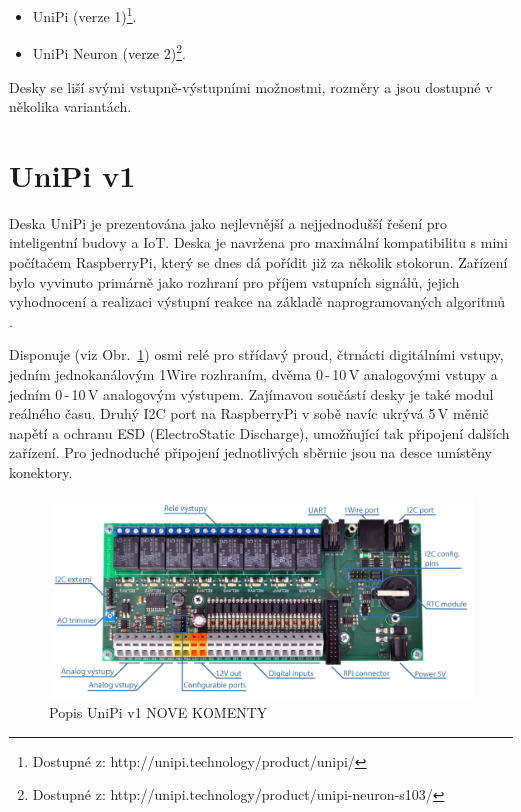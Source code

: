 \begin{itemize}
	\item UniPi (verze 1)\footnote[1]{Dostupné z: http://unipi.technology/product/unipi/}.
	\item UniPi Neuron (verze 2)\footnote[2]{Dostupné z: http://unipi.technology/product/unipi-neuron-s103/}.
\end{itemize}

\vspace{5mm}
Desky se liší svými vstupně-výstupními možnostmi, rozměry a jsou dostupné v několika variantách.




\section{UniPi v1}
\label{KapitolaUnipi1}

Deska UniPi je prezentována jako nejlevnější a nejjednodušší řešení pro inteligentní budovy a IoT. Deska je navržena pro maximální kompatibilitu s mini počítačem RaspberryPi, který se dnes dá pořídit již za několik stokorun.  Zařízení bylo vyvinuto primárně jako rozhraní pro příjem vstupních signálů, jejich vyhodnocení a realizaci výstupní reakce na základě naprogramovaných algoritmů \cite{UniPiBoard1}.

Disponuje (viz Obr.~\ref{ObrazekUnipiV1}) osmi relé pro střídavý proud, čtrnácti digitálními vstupy, jedním jednokanálovým 1Wire rozhraním, dvěma 0\,-\,10\,V analogovými vstupy a jedním 0\,-\,10\,V analogovým výstupem. Zajímavou součástí desky je také modul reálného času. Druhý I2C port na RaspberryPi v sobě navíc ukrývá 5\,V měnič napětí a ochranu ESD (ElectroStatic Discharge), umožňující tak připojení dalších zařízení. Pro jednoduché připojení jednotlivých sběrnic jsou na desce umístěny konektory.

 \begin{figure}[!h]
  \begin{center}
    \includegraphics[scale=0.35]{obrazky/unipi_v1}
  \end{center}
  \caption{Popis UniPi v1 \cite{UniPiBoard1} \colorbox[rgb]{1,0,0}{NOVE KOMENTY}  }
	\label{ObrazekUnipiV1}
\end{figure}

